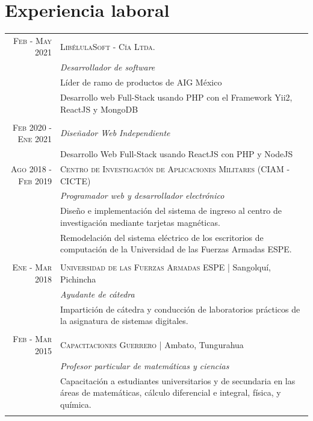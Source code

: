 \documentclass[a4paper,10.9pt]{article}
\begin{document}
\section{Experiencia laboral}
\begin{tabular}{r|p{11cm}}

\textsc{Feb - May 2021} &\textsc{LibélulaSoft - Cía Ltda.} \\&\emph{Desarrollador de software}\\&\footnotesize{Líder de ramo de productos de AIG México}\\&\footnotesize{Desarrollo web Full-Stack usando PHP con el Framework Yii2, ReactJS y MongoDB }\\
\multicolumn{2}{c}{} \\ 
\textsc{Feb 2020 - Ene 2021} &\emph{Diseñador Web Independiente}\\&\footnotesize{Desarrollo Web Full-Stack usando ReactJS con PHP y NodeJS}
\multicolumn{2}{c}{} \\
\textsc{Ago 2018 - Feb 2019} &\textsc{Centro de Investigación de Aplicaciones Militares (CIAM - CICTE)} \\&\emph{Programador web y desarrollador electrónico}\\&\footnotesize{Diseño e implementación del sistema de ingreso al centro de investigación mediante tarjetas magnéticas.}\\&\footnotesize{Remodelación del sistema eléctrico de los escritorios de computación de la Universidad de las Fuerzas Armadas ESPE.}\\  
\multicolumn{2}{c}{} \\
 \textsc{Ene - Mar 2018} &\textsc{Universidad de las Fuerzas Armadas ESPE} | Sangolquí, Pichincha \\&\emph{Ayudante de cátedra}\\&\footnotesize{Impartición de cátedra y conducción de laboratorios prácticos de la asignatura de sistemas digitales.}\\ 
\multicolumn{2}{c}{} \\
 \textsc{Feb - Mar 2015}&\textsc{Capacitaciones Guerrero} | Ambato, Tungurahua \\&\emph{Profesor particular de matemáticas y ciencias}\\&\footnotesize{Capacitación a estudiantes universitarios y de secundaria en las áreas de matemáticas, cálculo diferencial e integral, física, y química.}\\ &
\end{tabular}
\end{document}
